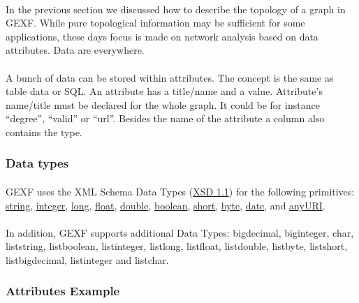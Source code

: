 \documentclass[a4paper,10pt]{article}
\begin{document}
\paragraph{}
In the previous section we discussed how to describe the topology of a graph in GEXF. While pure topological information may be sufficient for some applications, these days focus is made on network analysis based on data attributes. Data are everywhere.

\paragraph{}
A bunch of data can be stored within attributes. The concept is the same as table data or SQL. An attribute has a title/name and a value. Attribute’s name/title must be declared for the whole graph. It could be for instance “degree”, “valid” or “url”. Besides the name of the attribute a column also contains the type.

\subsubsection{Data types}

\paragraph{}
GEXF uses the XML Schema Data Types (\href{http://www.w3.org/TR/xmlschema-2/}{XSD 1.1}) for the following primitives: \href{http://www.w3.org/TR/xmlschema-2/#string}{string}, \href{http://www.w3.org/TR/xmlschema-2/#integer}{integer}, \href{http://www.w3.org/TR/xmlschema-2/#long}{long}, \href{http://www.w3.org/TR/xmlschema-2/#float}{float}, \href{http://www.w3.org/TR/xmlschema-2/#double}{double}, \href{http://www.w3.org/TR/xmlschema-2/#boolean}{boolean}, \href{http://www.w3.org/TR/xmlschema-2/#short}{short}, \href{http://www.w3.org/TR/xmlschema-2/#byte}{byte}, \href{http://www.w3.org/TR/xmlschema-2/#date}{date}, and \href{http://www.w3.org/TR/xmlschema-2/#anyURI}{anyURI}.

\paragraph{}
In addition, GEXF supports additional Data Types: bigdecimal, biginteger, char, liststring, listboolean, listinteger, listlong, listfloat, listdouble, listbyte, listshort, listbigdecimal, listinteger and listchar.

\subsubsection{Attributes Example}
\end{document}
